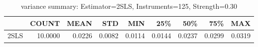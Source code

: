 \begin{table}[ht]
\centering
\caption{variance summary: Estimator=2SLS, Instruments=125, Strength=0.30}
\begin{tabular}{lrrrrrrrr}
\toprule
 & COUNT & MEAN & STD & MIN & 25\% & 50\% & 75\% & MAX \\
\midrule
2SLS & 10.0000 & 0.0226 & 0.0082 & 0.0114 & 0.0144 & 0.0237 & 0.0299 & 0.0319 \\
\bottomrule
\end{tabular}
\end{table}
